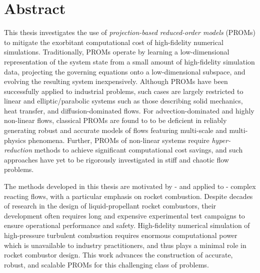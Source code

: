 \chapter{Abstract}


This thesis investigates the use of \textit{projection-based reduced-order models} (PROMs) to mitigate the exorbitant computational cost of high-fidelity numerical simulations. Traditionally, PROMs operate by learning a low-dimensional representation of the system state from a small amount of high-fidelity simulation data, projecting the governing equations onto a low-dimensional subspace, and evolving the resulting system inexpensively. Although PROMs have been successfully applied to industrial problems, such cases are largely restricted to linear and elliptic/parabolic systems such as those describing solid mechanics, heat transfer, and diffusion-dominated flows. For advection-dominated and highly non-linear flows, classical PROMs are found to to be deficient in reliably generating robust and accurate models of flows featuring multi-scale and multi-physics phenomena. Further, PROMs of non-linear systems require \textit{hyper-reduction} methods to achieve significant computational cost savings, and such approaches have yet to be rigorously investigated in stiff and chaotic  flow problems.

The methods developed in this thesis are motivated by - and applied to - complex reacting flows, with a particular emphasis on rocket combustion.
Despite decades of research in the design of liquid-propellant rocket combustors, their development often requires long and expensive experimental test campaigns to ensure operational performance and safety. %
High-fidelity numerical simulation of high-pressure turbulent combustion requires enormous computational power which is unavailable to industry practitioners, and thus plays a minimal role in rocket combustor design.
This  work advances the construction of accurate, robust, and scalable PROMs for this challenging class of problems.

